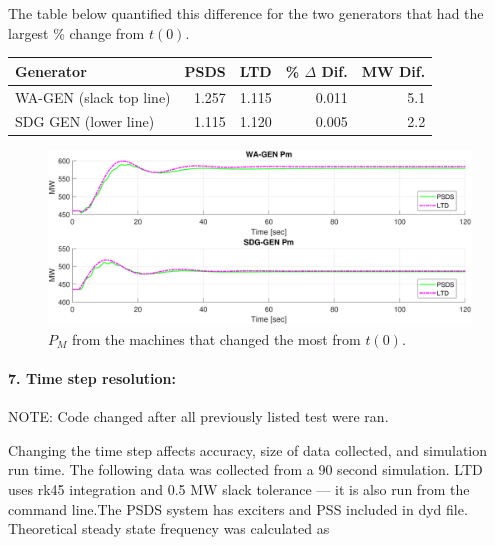 \documentclass[12pt]{article}
\begin{document}
The table below quantified this difference for the two generators that had the largest \% change from $t(0)$.

\begin{table}[!ht]
	\centering
	\begin{tabular}{@{} lrrrr @{}} 	
		\toprule %
		\footnotesize %
		 Generator & PSDS  & LTD  & \% $\Delta$ Dif. & MW Dif.  \\
		\midrule		
		WA-GEN (slack top line) & 1.257  & 1.115  & 0.011   & 5.1\\
		SDG GEN (lower line) & 1.115  & 1.120  & 0.005 & 2.2 \\
		\bottomrule
	\end{tabular}

\end{table}

	\begin{figure}[h!]
			\centering
			\includegraphics[width=\linewidth]{pmCompare}\vspace{-1em}
			\caption{$P_M$ from the machines that changed the most from $t(0)$.}
			\label{pmCompare}		 
	\end{figure}\vspace{-.5em}

\pagebreak
\paragraph{7. Time step resolution:} NOTE: Code changed after all previously listed test were ran.

Changing the time step affects accuracy, size of data collected, and simulation run time. The following data was collected from a 90 second simulation. LTD uses rk45 integration and 0.5 MW slack tolerance --- it is also run from the command line.The PSDS system has exciters and PSS included in dyd file.
Theoretical steady state frequency was calculated as 
\end{document}
